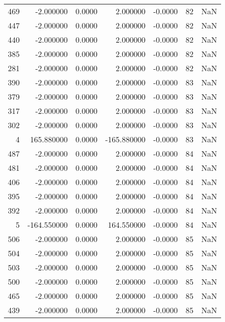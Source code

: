 \begin{tabular}{rrrrrrr}
469 &   -2.000000 &    0.0000 &    2.000000 &     -0.0000 &          82 & NaN \\
447 &   -2.000000 &    0.0000 &    2.000000 &     -0.0000 &          82 & NaN \\
440 &   -2.000000 &    0.0000 &    2.000000 &     -0.0000 &          82 & NaN \\
385 &   -2.000000 &    0.0000 &    2.000000 &     -0.0000 &          82 & NaN \\
281 &   -2.000000 &    0.0000 &    2.000000 &     -0.0000 &          82 & NaN \\
390 &   -2.000000 &    0.0000 &    2.000000 &     -0.0000 &          83 & NaN \\
379 &   -2.000000 &    0.0000 &    2.000000 &     -0.0000 &          83 & NaN \\
317 &   -2.000000 &    0.0000 &    2.000000 &     -0.0000 &          83 & NaN \\
302 &   -2.000000 &    0.0000 &    2.000000 &     -0.0000 &          83 & NaN \\
  4 &  165.880000 &    0.0000 & -165.880000 &     -0.0000 &          83 & NaN \\
487 &   -2.000000 &    0.0000 &    2.000000 &     -0.0000 &          84 & NaN \\
481 &   -2.000000 &    0.0000 &    2.000000 &     -0.0000 &          84 & NaN \\
406 &   -2.000000 &    0.0000 &    2.000000 &     -0.0000 &          84 & NaN \\
395 &   -2.000000 &    0.0000 &    2.000000 &     -0.0000 &          84 & NaN \\
392 &   -2.000000 &    0.0000 &    2.000000 &     -0.0000 &          84 & NaN \\
  5 & -164.550000 &    0.0000 &  164.550000 &     -0.0000 &          84 & NaN \\
506 &   -2.000000 &    0.0000 &    2.000000 &     -0.0000 &          85 & NaN \\
504 &   -2.000000 &    0.0000 &    2.000000 &     -0.0000 &          85 & NaN \\
503 &   -2.000000 &    0.0000 &    2.000000 &     -0.0000 &          85 & NaN \\
500 &   -2.000000 &    0.0000 &    2.000000 &     -0.0000 &          85 & NaN \\
465 &   -2.000000 &    0.0000 &    2.000000 &     -0.0000 &          85 & NaN \\
439 &   -2.000000 &    0.0000 &    2.000000 &     -0.0000 &          85 & NaN \\

\end{tabular}
